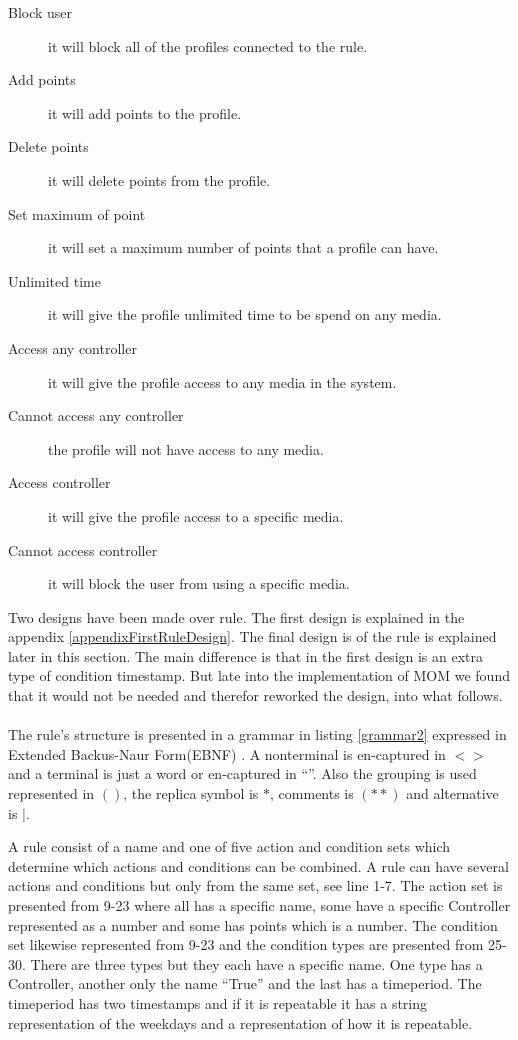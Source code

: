 \begin{description}
	\item[Block user] it will block all of the profiles connected to the rule. 
	\item[Add points] it will add points to the profile.
	\item[Delete points]  it will delete points from the profile.  
	\item[Set maximum of point] it will set a maximum number of points that a profile can have. 
	\item[Unlimited time] it will give the profile unlimited time to be spend on any media. 
	\item[Access any controller] it will give the profile access to any media in the system. 
	\item[Cannot access any controller] the profile will not have access to any media. 
	\item[Access controller] it will give the profile access to a specific media. 
	\item[Cannot access controller] it will block the user from using a specific media. 
\end{description}
Two designs have been made over rule. The first design is explained in the appendix \vref{appendixFirstRuleDesign}. The final design is of the rule is explained later in this section. The main difference is that in the first design is an extra type of condition timestamp. But late into the implementation of MOM we found that it would not be needed and therefor reworked the design, into what follows.\\
\\
The rule's structure is presented in a grammar in listing	\ref{grammar2} expressed in Extended Backus-Naur Form(EBNF) \citep{CoPL}.
A nonterminal is en-captured in $<>$ and a terminal is just a word or en-captured in ``''. 
Also the grouping is used represented in $()$, the replica symbol is $*$, comments is $(**)$ and alternative is $|$. 

A rule consist of a name and one of five action and condition sets which determine which actions and conditions can be combined. A rule can have several actions and conditions but only from the same set, see line 1-7. The action set is presented from 9-23 where all has a specific name, some have a specific Controller represented as a number and some has points which is a number. The condition set likewise represented from 9-23 and the condition types are presented from 25-30. There are three types but they each have a specific name. One type has a Controller, another only the name ``True'' and the last has a timeperiod. The timeperiod has two timestamps and if it is repeatable it has a string representation of the weekdays and a representation of how it is repeatable. 

